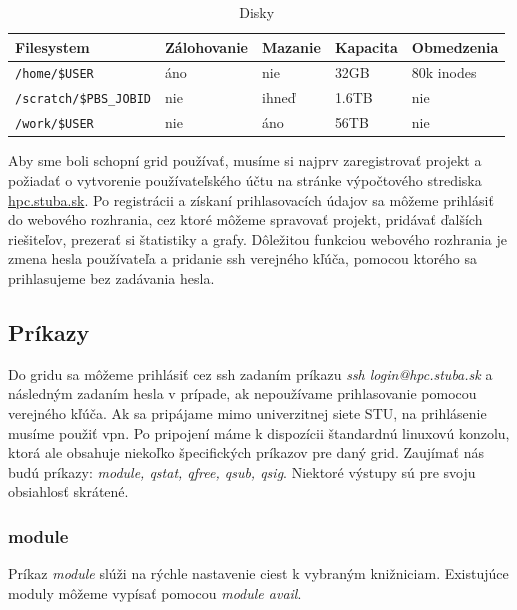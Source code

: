 \begin{table}[!h]
\centering
\begin{tabular}{@{}lllll@{}}
\toprule
\textbf{Filesystem}   & \textbf{Zálohovanie} & \textbf{Mazanie} & \textbf{Kapacita} & \textbf{Obmedzenia} \\ \midrule
\texttt{/home/\$USER}          & áno                  & nie              & 32GB              & 80k inodes          \\
\texttt{/scratch/\$PBS\_JOBID} & nie                  & ihneď            & 1.6TB             & nie                 \\
\texttt{/work/\$USER}          & nie                  & áno              & 56TB              & nie                 \\ \bottomrule
\end{tabular}
\caption{Disky}
\label{tab:filesystem}
\end{table}

Aby sme boli schopní grid používať, musíme si najprv zaregistrovať projekt a požiadať o vytvorenie
používateľského účtu na stránke výpočtového strediska \url{hpc.stuba.sk}.
Po registrácii a získaní prihlasovacích údajov sa môžeme prihlásiť do webového rozhrania, cez ktoré môžeme spravovať projekt,
pridávať ďalších riešiteľov, prezerať si štatistiky a grafy.
Dôležitou funkciou webového rozhrania je zmena hesla používateľa a pridanie \acrshort{ssh} verejného kľúča, pomocou ktorého sa prihlasujeme bez zadávania hesla.

\subsection{Príkazy}
Do gridu sa môžeme prihlásiť cez \acrshort{ssh} zadaním príkazu \textit{ssh login@hpc.stuba.sk} a následným zadaním hesla v prípade,
ak nepoužívame prihlasovanie pomocou verejného kľúča.
Ak sa pripájame mimo univerzitnej siete STU, na prihlásenie musíme použiť \acrshort{vpn}.
Po pripojení máme k dispozícii štandardnú linuxovú konzolu, ktorá ale obsahuje niekoľko špecifických príkazov pre daný grid.
Zaujímať nás budú príkazy: \textit{module, qstat, qfree, qsub, qsig}.
Niektoré výstupy sú pre svoju obsiahlosť skrátené.

\subsubsection{module}
\label{kap:module}
Príkaz \textit{module} slúži na rýchle nastavenie ciest k vybraným knižniciam.
Existujúce moduly môžeme vypísať pomocou \textit{module avail}.

